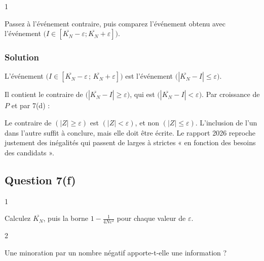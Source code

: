 \documentclass[11pt,a4paper]{article}
\newcommand{\equationajustee}[1]{%
  \sbox{\boiteequation}{$\displaystyle #1$}%
  \ifdim\wd\boiteequation>\linewidth
    \[\resizebox{\linewidth}{!}{\usebox{\boiteequation}}\]%
  \else
    \[#1\]%
  \fi}
\begin{document}
\begin{indication}{1}

Passez à l'événement contraire, puis comparez l'événement obtenu avec l'événement \(\big(I\in[\overline{K_N}-\varepsilon;\overline{K_N}+\varepsilon]\big)\).

\end{indication}

\hypertarget{solution-34}{%
\subsubsection{Solution}\label{solution-34}}

L'événement \(\big(I\in[\overline{K_N}-\varepsilon\,;\,\overline{K_N}+\varepsilon]\big)\) est l'événement \(\big(|\overline{K_N}-I|\le\varepsilon\big)\).

Il contient le contraire de \(\big(|\overline{K_N}-I|\ge\varepsilon\big)\), qui est \(\big(|\overline{K_N}-I|<\varepsilon\big)\). Par croissance de \(P\) et par 7(d) :

\equationajustee{\boxed{P\big(I\in[\overline{K_N}-\varepsilon\,;\,\overline{K_N}+\varepsilon]\big)\geqslant1-\frac1{4N\varepsilon^2}}}

\begin{piege}

Le contraire de \((|Z|\ge\varepsilon)\) est \((|Z|<\varepsilon)\), et non \((|Z|\le\varepsilon)\). L'inclusion de l'un dans l'autre suffit à conclure, mais elle doit être écrite. Le rapport 2026 reproche justement des inégalités qui passent de larges à strictes « en fonction des besoins des candidats ».

\end{piege}

\hypertarget{question-7f}{%
\subsection{Question 7(f)}\label{question-7f}}

\begin{indication}{1}

Calculez \(\overline{K_N}\), puis la borne \(1-\frac1{4N\varepsilon^2}\) pour chaque valeur de \(\varepsilon\).

\end{indication}

\begin{indication}{2}

Une minoration par un nombre négatif apporte-t-elle une information ?

\end{indication}
\end{document}
